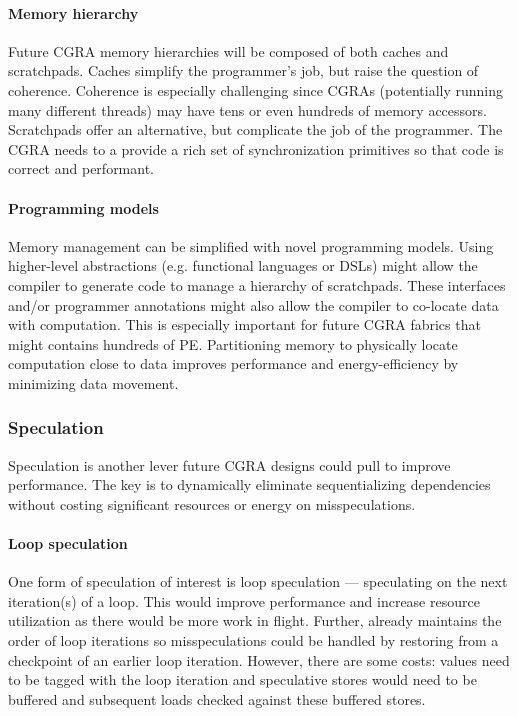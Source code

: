 \paragraph{Memory hierarchy}
Future CGRA memory hierarchies will be composed of both caches and scratchpads.
% 
Caches simplify the programmer's job, but raise the question of coherence.
% 
Coherence is especially challenging since CGRAs (potentially running many different threads) may have tens or even hundreds of memory accessors.
% 
Scratchpads offer an alternative, but complicate the job of the programmer.
% 
The CGRA needs to a provide a rich set of synchronization primitives so that code is correct and performant.

\paragraph{Programming models}
Memory management can be simplified with novel programming models.
% 
Using higher-level abstractions (e.g. functional languages or DSLs) might allow the compiler to generate code to manage a hierarchy of scratchpads.
%
These interfaces and/or programmer annotations might also allow the compiler to co-locate data with computation.
% 
This is especially important for future CGRA fabrics that might contains hundreds of PE.
% 
Partitioning memory to physically locate computation close to data improves performance and energy-efficiency by minimizing data movement.

\subsubsection{Speculation}
Speculation is another lever future CGRA designs could pull to improve performance.
%
The key is to dynamically eliminate sequentializing dependencies without costing significant resources or energy on misspeculations.

\paragraph{Loop speculation}
One form of speculation of interest is loop speculation --- speculating on the next iteration(s) of a loop.
% 
This would improve performance and increase resource utilization as there would be more work in flight.
% 
Further, \riptide already maintains the order of loop iterations so misspeculations could be handled by restoring from a checkpoint of an earlier loop iteration.
% 
However, there are some costs: values need to be tagged with the loop iteration and speculative stores would need to be buffered and subsequent loads checked against these buffered stores.

